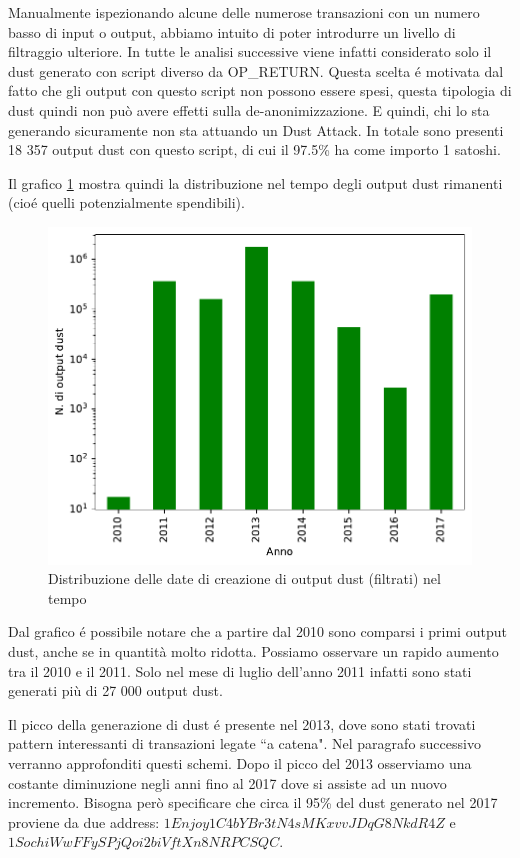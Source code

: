 Manualmente ispezionando alcune delle numerose transazioni con un numero basso di input o output, abbiamo intuito di poter introdurre un livello di filtraggio ulteriore. In tutte le analisi successive viene infatti considerato solo il dust generato con script diverso da OP\_RETURN. Questa scelta é motivata dal fatto che gli output con questo script non possono essere spesi, questa tipologia di dust quindi non può avere effetti sulla de-anonimizzazione. E quindi, chi lo sta generando sicuramente non sta attuando un Dust Attack. In totale sono presenti 18 357 output dust con questo script, di cui il 97.5\% ha come importo 1 satoshi.

Il grafico \ref{fig:dust_created} mostra quindi la distribuzione nel tempo degli output dust rimanenti (cioé quelli potenzialmente spendibili).
\begin{figure}[h!]
    \centering
    \includegraphics[scale=0.9]{Grafici/dust_created_year.pdf}
    \caption{Distribuzione delle date di creazione di output dust (filtrati) nel tempo}
    \label{fig:dust_created}
\end{figure}
\FloatBarrier 

Dal grafico é possibile notare che a partire dal 2010 sono comparsi i primi output dust, anche se in quantità molto ridotta. Possiamo osservare un rapido aumento tra il 2010 e il 2011. Solo nel mese di luglio dell'anno 2011 infatti sono stati generati più di 27 000 output dust.

Il picco della generazione di dust é presente nel 2013, dove sono stati trovati pattern interessanti di transazioni legate ``a catena". Nel paragrafo successivo verranno approfonditi questi schemi. Dopo il picco del 2013 osserviamo una costante diminuzione negli anni fino al 2017 dove si assiste ad un nuovo incremento. Bisogna però specificare che circa il 95\% del dust generato nel 2017 proviene da due address: $1Enjoy1C4bYBr3tN4sMKxvvJDqG8NkdR4Z$ e $1SochiWwFFySPjQoi2biVftXn8NRPCSQC$.

